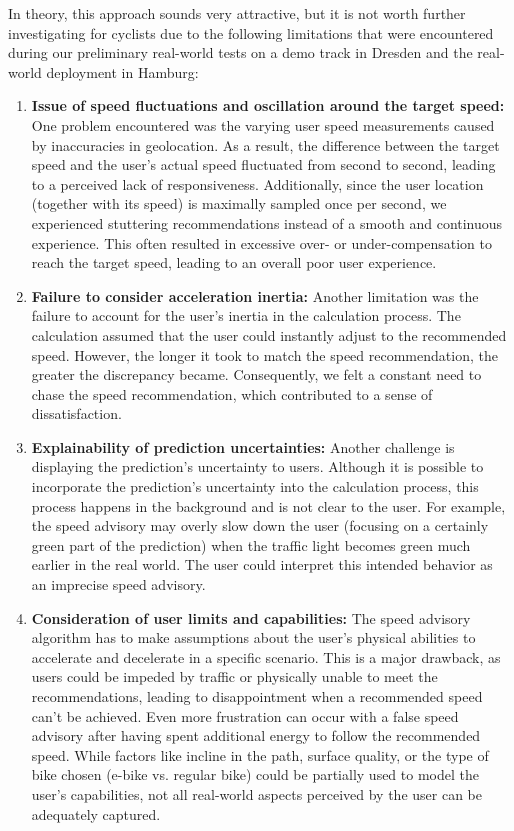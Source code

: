 In theory, this approach sounds very attractive, but it is not worth further investigating for cyclists due to the following limitations that were encountered during our preliminary real-world tests on a demo track in Dresden and the real-world deployment in Hamburg:

\begin{enumerate}
\item \textbf{Issue of speed fluctuations and oscillation around the target speed:} One problem encountered was the varying user speed measurements caused by inaccuracies in geolocation. As a result, the difference between the target speed and the user's actual speed fluctuated from second to second, leading to a perceived lack of responsiveness. Additionally, since the user location (together with its speed) is maximally sampled once per second, we experienced stuttering recommendations instead of a smooth and continuous experience. This often resulted in excessive over- or under-compensation to reach the target speed, leading to an overall poor user experience.
\item \textbf{Failure to consider acceleration inertia:} Another limitation was the failure to account for the user's inertia in the calculation process. The calculation assumed that the user could instantly adjust to the recommended speed. However, the longer it took to match the speed recommendation, the greater the discrepancy became. Consequently, we felt a constant need to chase the speed recommendation, which contributed to a sense of dissatisfaction.
\item \textbf{Explainability of prediction uncertainties:} Another challenge is displaying the prediction's uncertainty to users. Although it is possible to incorporate the prediction's uncertainty into the calculation process, this process happens in the background and is not clear to the user. For example, the speed advisory may overly slow down the user (focusing on a certainly green part of the prediction) when the traffic light becomes green much earlier in the real world. The user could interpret this intended behavior as an imprecise speed advisory.
\item \textbf{Consideration of user limits and capabilities:} The speed advisory algorithm has to make assumptions about the user's physical abilities to accelerate and decelerate in a specific scenario. This is a major drawback, as users could be impeded by traffic or physically unable to meet the recommendations, leading to disappointment when a recommended speed can't be achieved. Even more frustration can occur with a false speed advisory after having spent additional energy to follow the recommended speed. While factors like incline in the path, surface quality, or the type of bike chosen (e-bike vs. regular bike) could be partially used to model the user's capabilities, not all real-world aspects perceived by the user can be adequately captured.

\end{enumerate}
